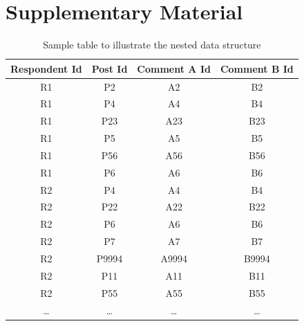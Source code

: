 \documentclass{article}
\begin{document}
\newpage



\clearpage
\section{Supplementary Material}

\begin{table}[htbp]
    \centering
    \begin{tabular}{|c|c|c|c|}
    \hline
    \textbf{Respondent Id} & \textbf{Post Id} & \textbf{Comment A Id} & \textbf{Comment B Id} \\
    \hline
    R1 & P2 & A2 & B2 \\
    R1 & P4 & A4 & B4 \\
    R1 & P23 & A23 & B23 \\
    R1 & P5 & A5 & B5 \\
    R1 & P56 & A56 & B56 \\
    R1 & P6 & A6 & B6 \\
    \midrule
    R2 & P4 & A4 & B4 \\
    R2 & P22 & A22 & B22 \\
    R2 & P6 & A6 & B6 \\
    R2 & P7 & A7 & B7 \\
    R2 & P9994 & A9994 & B9994 \\
    R2 & P11 & A11 & B11 \\
    R2 & P55 & A55 & B55 \\
    \midrule
    \dots & \dots & \dots & \dots \\
    \hline
    \end{tabular}
    \caption{Sample table to illustrate the nested data structure}
    \label{sample-table}
\end{table}

\clearpage

\end{document}
